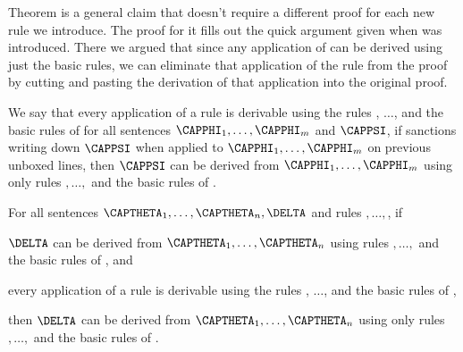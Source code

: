 Theorem  is a general claim that doesn't require a different proof for each new rule we introduce. 
The proof for it fills out the quick argument given when  was introduced. There we argued that since any application of  can be derived using just the basic rules, we can eliminate that application of the rule from the proof by cutting and pasting the derivation of that application into the original proof. 
\begin{majorILnc}{}
We say that every application of a rule  is derivable using the rules , $\ldots$,  and the basic rules of \GSD{} \Iff for all \GSL{} sentences $\CAPPHI_1,\ldots,\CAPPHI_{\integer{m}}$ and $\CAPPSI$, if  sanctions writing down $\CAPPSI$ when applied to $\CAPPHI_1,\ldots,\CAPPHI_{\integer{m}}$ on previous unboxed lines, then $\CAPPSI$ can be derived from $\CAPPHI_1,\ldots,\CAPPHI_{\integer{m}}$ using only rules $,\ldots,$ and the basic rules of \GSD{}.
\end{majorILnc}
\begin{THEOREM}{}
For all \GSL{} sentences $\CAPTHETA_1,\ldots,\CAPTHETA_{\integer{n}},\DELTA$ and rules $,\ldots,$, if
\begin{cenumerate}
\item $\DELTA$ can be derived from $\CAPTHETA_1,\ldots,\CAPTHETA_{\integer{n}}$ using rules $,\ldots,$ and the basic rules of \GSD{}, and
\item every application of a rule  is derivable using the rules , $\ldots$,  and the basic rules of \GSD{},
\end{cenumerate}
then $\DELTA$ can be derived from $\CAPTHETA_1,\ldots,\CAPTHETA_{\integer{n}}$ using only rules $,\ldots,$ and the basic rules of \GSD{}.
\end{THEOREM}
